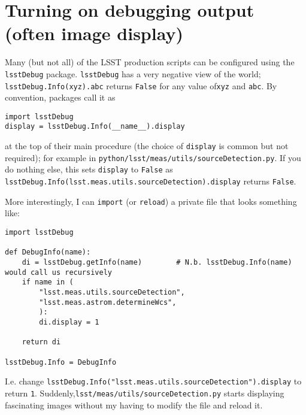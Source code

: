 \section{Turning on debugging output (often image display)}

Many (but not all) of the LSST production scripts can be configured using the \verb|lsstDebug| package. \verb|lsstDebug| has a very negative view of the world; \verb|lsstDebug.Info(xyz).abc| returns \verb|False| for any value of\verb|xyz| and \verb|abc|.  By convention, packages call it as
\begin{verbatim}
import lsstDebug
display = lsstDebug.Info(__name__).display
\end{verbatim}
at the top of their main procedure (the choice of \verb|display| is common but not required); for example in \texttt{python/lsst/meas/utils/sourceDetection.py}. If you do nothing else, this sets \verb|display| to \verb|False| as \linebreak[4] \verb|lsstDebug.Info(lsst.meas.utils.sourceDetection).display| returns \verb|False|.

More interestingly, I can \verb|import| (or \verb|reload|) a private file that looks something like:

\begin{verbatim}
import lsstDebug

def DebugInfo(name):
    di = lsstDebug.getInfo(name)        # N.b. lsstDebug.Info(name) would call us recursively
    if name in (
        "lsst.meas.utils.sourceDetection",
        "lsst.meas.astrom.determineWcs",
        ):
        di.display = 1

    return di

lsstDebug.Info = DebugInfo
\end{verbatim}

I.e. change \verb|lsstDebug.Info("lsst.meas.utils.sourceDetection").display| to return \verb|1|.
Suddenly,\linebreak[4] \verb|lsst/meas/utils/sourceDetection.py| starts displaying fascinating images without
my having to modify the file and reload it.

